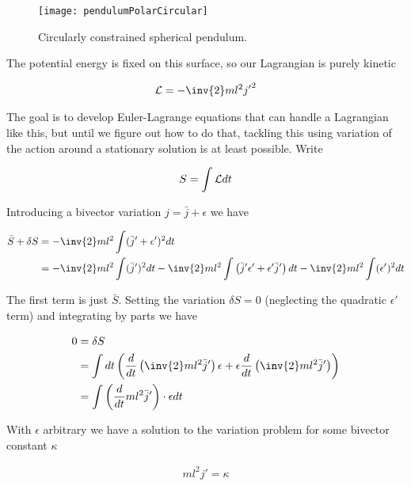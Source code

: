 \begin{figure}[htp]
\centering
\texttt{[image: pendulumPolarCircular]}
\caption{Circularly constrained spherical pendulum.}\label{fig:sPolarMultiPendulum:pendulumPolarCircular}
\end{figure}

The potential energy is fixed on this surface, so our Lagrangian is purely kinetic

\begin{align}\label{eqn:sPolarMultiPendulum:noo1}
\LL = -\inv{2} m l^2 {j'}^2
\end{align}

The goal is to develop Euler-Lagrange equations that can handle a Lagrangian like this, but until we figure out how to do that, tackling this using variation of the action around a stationary solution is at least possible.  Write

\begin{align}\label{eqn:sPolarMultiPendulum:noo2}
S = \int \mathcal{L} dt
\end{align}

Introducing a bivector variation $j = \bar{j} + \epsilon$ we have

\begin{align*}
\bar{S} + \delta S 
&= 
-\inv{2} m l^2 \int (\bar{j}' + \epsilon')^2 dt \\
&= 
-\inv{2} m l^2 \int (\bar{j}')^2 dt
-\inv{2} m l^2 \int \left( {\bar{j}}' \epsilon' + \epsilon' {\bar{j}}' \right) dt
-\inv{2} m l^2 \int (\epsilon')^2 dt
\end{align*}

The first term is just $\bar{S}$.  Setting the variation $\delta S = 0$ (neglecting the quadratic $\epsilon'$ term) and integrating by parts we have

\begin{align*}
0 &= \delta S \\
&= 
\int dt \left( \frac{d}{dt}\left( \inv{2} m l^2 {\bar{j}}' \right) \epsilon + \epsilon \frac{d}{dt}\left( \inv{2} m l^2 {\bar{j}}' \right) \right) \\
&= 
\int \left( \frac{d}{dt} m l^2 {\bar{j}}' \right) \cdot \epsilon dt 
\end{align*}

With $\epsilon$ arbitrary we have a solution to the variation problem for some bivector constant $\kappa$

\begin{align}\label{eqn:sPolarMultiPendulum:noo3}
m l^2 j' = \kappa
\end{align}

